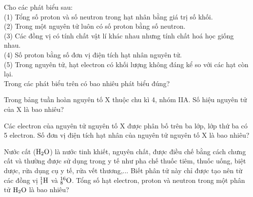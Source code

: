 \documentclass[11pt,a4paper]{article}
\begin{document}
\begin{ex}
Cho các phát biểu sau:\\
(1) Tổng số proton và số neutron trong hạt nhân bằng giá trị số khối.\\
(2) Trong một nguyên tử luôn có số proton bằng số neutron.\\
(3) Các đồng vị có tính chất vật lí khác nhau nhưng tính chất hoá học giống nhau.\\
(4) Số proton bằng số đơn vị điện tích hạt nhân nguyên tử.\\
(5) Trong nguyên tử, hạt electron có khối lượng không đáng kể so với các hạt còn lại.\\
Trong các phát biểu trên có bao nhiêu phát biểu đúng?

\end{ex}
\begin{ex}
Trong bảng tuần hoàn nguyên tố X thuộc chu kì 4, nhóm IIA. Số hiệu nguyên tử của X là bao nhiêu?

\end{ex}
\begin{ex}
Các electron của nguyên tử nguyên tố X được phân bố trên ba lớp, lớp thứ ba có 5 electron. Số đơn vị điện tích hạt nhân của nguyên tử nguyên tố X là bao nhiêu?

\end{ex}
\begin{ex}
Nước cất ($\ce{H2O}$) là nước tinh khiết, nguyên chất, được điều chế bằng cách chưng cất và thường được sử dụng trong y tế như pha chế thuốc tiêm, thuốc uống, biệt dược, rửa dụng cụ y tế, rửa vết thương,... Biết phân tử này chỉ được tạo nên từ các đồng vị $^1_1\ce{H}$ và $^{16}_8\ce{O}$. Tổng số hạt electron, proton và neutron trong một phân tử $\ce{H2O}$ là bao nhiêu?

\end{ex}
\end{document}
